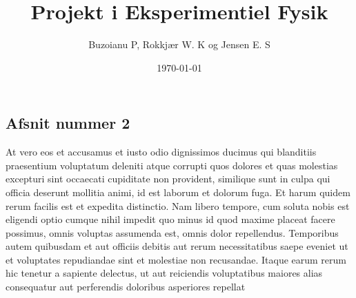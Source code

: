 \documentclass[a4paper,oneside,article]{memoir}
\author{Buzoianu P, Rokkjær W. K og Jensen E. S}
\title{Projekt i Eksperimentiel Fysik}
\date{\today}
\begin{document}
    \maketitle
    \subsection*{Afsnit nummer 2}
    At vero eos et accusamus et iusto odio dignissimos ducimus qui blanditiis praesentium voluptatum deleniti atque corrupti quos dolores et quas molestias excepturi sint occaecati cupiditate non provident, 
    similique sunt in culpa qui officia deserunt mollitia animi, id est laborum et dolorum fuga. 
    Et harum quidem rerum facilis est et expedita distinctio. 
    Nam libero tempore, cum soluta nobis est eligendi optio cumque nihil impedit quo minus id quod maxime placeat facere possimus, 
    omnis voluptas assumenda est, omnis dolor repellendus. 
    Temporibus autem quibusdam et aut officiis debitis aut rerum necessitatibus saepe eveniet ut et voluptates repudiandae sint et molestiae non recusandae. 
    Itaque earum rerum hic tenetur a sapiente delectus, ut aut reiciendis voluptatibus maiores alias consequatur aut perferendis doloribus asperiores repellat
\end{document}
